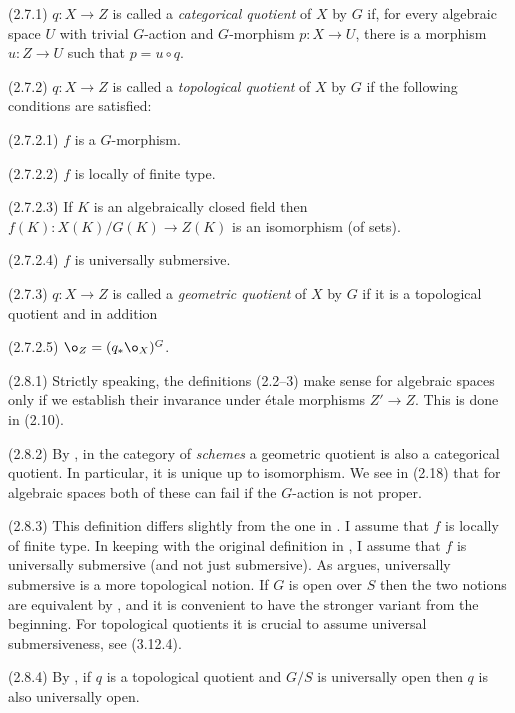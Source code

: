 (2.7.1) $q:X\to Z$ is called a {\it categorical quotient} of $X$ by $G$
if, for every algebraic space $U$ with trivial $G$-action and $G$-morphism
$p:X\to U$,  there is a morphism $u:Z\to U$  such that  $p=u\circ q$.

(2.7.2) $q:X\to Z$ is called a {\it topological quotient} of $X$ by $G$
if  the following   conditions are
satisfied:

(2.7.2.1) $f$ is a $G$-morphism.

(2.7.2.2) $f$ is locally of finite type.

(2.7.2.3) If $K$ is  an algebraically closed field then
$f(K):X(K)/G(K)\to Z(K)$ is an isomorphism (of sets).

(2.7.2.4) $f$ is universally submersive.

(2.7.3) $q:X\to Z$ is called a {\it geometric quotient} of $X$ by $G$
if  it is a topological quotient and in addition

(2.7.2.5) $\o_Z=(q_*\o_X)^G$.
\enddemo

  (2.8.1)  Strictly speaking, the definitions (2.2--3)
make sense for algebraic spaces only if we establish their invarance under
\'etale morphisms $Z'\to Z$.  This is done in (2.10).

(2.8.2) By \cite{Mumford-Fogarty82, 0.1}, in the
category of {\it schemes} a geometric quotient is also a categorical quotient.
In  particular, it is unique up to isomorphism. We see in (2.18) that for
algebraic spaces both of these can fail if the $G$-action is not proper.

(2.8.3) This definition differs  slightly from the one in
\cite{Mumford-Fogarty82, sec. 0.1}. I assume that $f$ is locally of finite
type. In keeping with the original definition in \cite{Mumford65, sec. 0.1}, I
assume that $f$ is universally submersive (and not just submersive).
As \cite{Mumford65, sec. 0.1} argues, universally submersive is a more
topological notion. If $G$ is open over $S$ then the two notions are
equivalent by \cite{Dixmier-Raynaud81, 1.9}, and it is convenient to have the
stronger variant from the beginning.
For topological quotients it is crucial to assume universal submersiveness,
see (3.12.4).

(2.8.4) By \cite{Mumford-Fogarty82, p.6}, if $q$ is a topological quotient
and $G/S$ is universally open
then
$q$ is also universally open.
\enddemo













